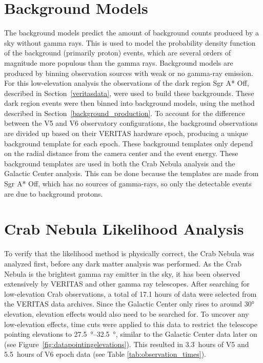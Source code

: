 \section{Background Models}\label{sec:bkgmodels}
  The background models predict the amount of background counts produced by a sky without gamma rays.
  This is used to model the probability density function of the background (primarily proton) events, which are several orders of magnitude more populous than the gamma rays.
  Background models are produced by binning observation sources with weak or no gamma-ray emission.
  For this low-elevation analysis the observations of the dark region Sgr A* Off, described in Section~\ref{veritasdata}, were used to build these backgrounds.
  These dark region events were then binned into background models, using the method described in Section~\ref{background_production}.
  To account for the difference between the V5 and V6 observatory configurations, the background observations are divided up based on their VERITAS hardware epoch, producing a unique background template for each epoch.
  These background templates only depend on the radial distance from the camera center and the event energy.
  These background templates are used in both the Crab Nebula analysis and the Galactic Center analysis.
  This can be done because the templates are made from Sgr A* Off, which has no sources of gamma-rays, so only the detectable events are due to background protons.

\section{Crab Nebula Likelihood Analysis}\label{sec:crab_analysis}
  To verify that the likelihood method is physically correct, the Crab Nebula was analyzed first, before any dark matter analysis was performed.
  As the Crab Nebula is the brightest gamma ray emitter in the sky, it has been observed extensively by VERITAS and other gamma ray telescopes.
  After searching for low-elevation Crab observations, a total of 17.1 hours of data were selected from the VERITAS data archives.
  Since the Galactic Center only rises to around \ang{30} elevation, elevation effects would also need to be searched for.
  To uncover any low-elevation effects, time cuts were applied to this data to restrict the telescope pointing elevations to \SIrange{27.5}{32.5}{\degree}, similar to the Galactic Center data later on (see Figure~\ref{fig:datapointingelevations}).
  This resulted in \SI{3.3}{hours} of V5 and \SI{5.5}{hours} of V6 epoch data (see Table \ref{tab:observation_times}).
    
